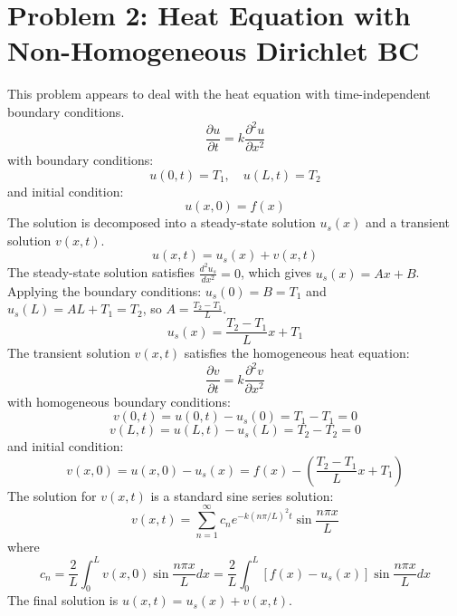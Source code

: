\documentclass{article}
\begin{document}
	\section*{Problem 2: Heat Equation with Non-Homogeneous Dirichlet BC}
	This problem appears to deal with the heat equation with time-independent boundary conditions.
	$$
	\frac{\partial u}{\partial t} = k \frac{\partial^2 u}{\partial x^2}
	$$
	with boundary conditions:
	$$
	u(0, t) = T_1, \quad u(L, t) = T_2
	$$
	and initial condition:
	$$
	u(x, 0) = f(x)
	$$
	The solution is decomposed into a steady-state solution $u_s(x)$ and a transient solution $v(x,t)$.
	$$
	u(x, t) = u_s(x) + v(x, t)
	$$
	The steady-state solution satisfies $\frac{d^2 u_s}{dx^2} = 0$, which gives $u_s(x) = A x + B$.
	Applying the boundary conditions: $u_s(0) = B = T_1$ and $u_s(L) = AL + T_1 = T_2$, so $A = \frac{T_2 - T_1}{L}$.
	$$
	u_s(x) = \frac{T_2 - T_1}{L} x + T_1
	$$
	The transient solution $v(x,t)$ satisfies the homogeneous heat equation:
	$$
	\frac{\partial v}{\partial t} = k \frac{\partial^2 v}{\partial x^2}
	$$
	with homogeneous boundary conditions:
	$$
	v(0, t) = u(0,t) - u_s(0) = T_1 - T_1 = 0
	$$
	$$
	v(L, t) = u(L,t) - u_s(L) = T_2 - T_2 = 0
	$$
	and initial condition:
	$$
	v(x, 0) = u(x,0) - u_s(x) = f(x) - \left( \frac{T_2 - T_1}{L} x + T_1 \right)
	$$
	The solution for $v(x,t)$ is a standard sine series solution:
	$$
	v(x, t) = \sum_{n=1}^{\infty} c_n e^{-k(n\pi/L)^2 t} \sin\frac{n\pi x}{L}
	$$
	where
	$$
	c_n = \frac{2}{L} \int_0^L v(x,0) \sin\frac{n\pi x}{L} dx = \frac{2}{L} \int_0^L \left[ f(x) - u_s(x) \right] \sin\frac{n\pi x}{L} dx
	$$
	The final solution is $u(x,t) = u_s(x) + v(x,t)$.
	
\end{document}
